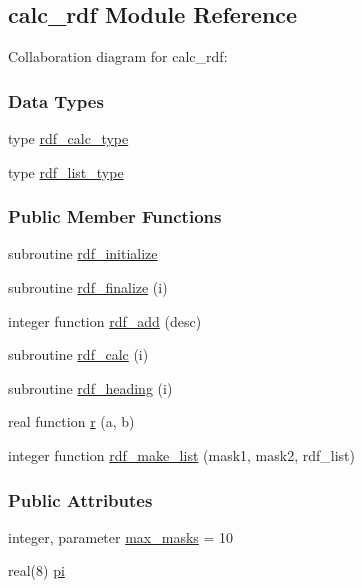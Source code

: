 \hypertarget{classcalc__rdf}{\subsection{calc\-\_\-rdf Module Reference}
\label{classcalc__rdf}
}


Collaboration diagram for calc\-\_\-rdf\-:
\subsubsection*{Data Types}
\begin{DoxyCompactItemize}
\item 
type \hyperlink{structcalc__rdf_1_1rdf__calc__type}{rdf\-\_\-calc\-\_\-type}
\item 
type \hyperlink{structcalc__rdf_1_1rdf__list__type}{rdf\-\_\-list\-\_\-type}
\end{DoxyCompactItemize}
\subsubsection*{Public Member Functions}
\begin{DoxyCompactItemize}
\item 
subroutine \hyperlink{classcalc__rdf_a70120abf4305f3ab2df1ab09476a9d34}{rdf\-\_\-initialize}
\item 
subroutine \hyperlink{classcalc__rdf_a4fe98fe00b67ceadd0ce93d9a9eae6a7}{rdf\-\_\-finalize} (i)
\item 
integer function \hyperlink{classcalc__rdf_ab8e05d1bd81788d16237447d9f66edd9}{rdf\-\_\-add} (desc)
\item 
subroutine \hyperlink{classcalc__rdf_a7ab1dc36ff759913cf0737ae82a2c37b}{rdf\-\_\-calc} (i)
\item 
subroutine \hyperlink{classcalc__rdf_a77981fcf63075933497714a8f8f6ba3b}{rdf\-\_\-heading} (i)
\item 
real function \hyperlink{classcalc__rdf_a203d29eb42a922de8786e02bef09868a}{r} (a, b)
\item 
integer function \hyperlink{classcalc__rdf_ace02e21741269c7f784df65580af7711}{rdf\-\_\-make\-\_\-list} (mask1, mask2, rdf\-\_\-list)
\end{DoxyCompactItemize}
\subsubsection*{Public Attributes}
\begin{DoxyCompactItemize}
\item 
integer, parameter \hyperlink{classcalc__rdf_ab5e39e9764e56704c253909fa016a1b3}{max\-\_\-masks} = 10
\item 
real(8) \hyperlink{classcalc__rdf_aa3ae710f9cac6076af7157a2cfd376fc}{pi}
\end{DoxyCompactItemize}

